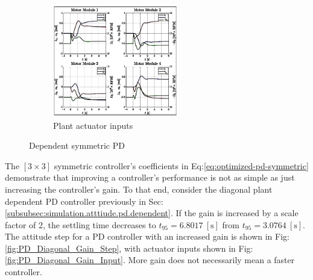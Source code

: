 \begin{figure}[htbp]
\begin{subfigure}{0.49\textwidth}
\end{subfigure}
\begin{subfigure}{\textwidth}
\centering
\includegraphics[width=0.6\textwidth]{graphs/PD_Diagonal_Dependent_Input}
\vspace{-8pt}
\caption{Plant actuator inputs}
\label{fig:PD_3x3_Dependent_Input}
\end{subfigure}
\vspace{-8pt}
\caption{Dependent symmetric PD}
\vspace{-26pt}
\end{figure}
\par
The $[3\times 3]$ symmetric controller's coefficients in Eq:\ref{eq:optimized-pd-symmetric} demonstrate that improving a controller's performance is not as simple as just increasing the controller's gain. To that end, consider the diagonal plant dependent PD controller previously in Sec:\ref{subsubsec:simulation.atttiude.pd.dependent}. If the gain is increased by a scale factor of 2, the settling time decreases to $t_{95}=6.8017~[\text{s}]$ from $t_{95}=3.0764~[\text{s}]$. The attitude step for a PD controller with an increased gain is shown in Fig:\ref{fig:PD_Diagonal_Gain_Step}, with actuator inputs shown in Fig:\ref{fig:PD_Diagonal_Gain_Input}. More gain does not necessarily mean a faster controller.
